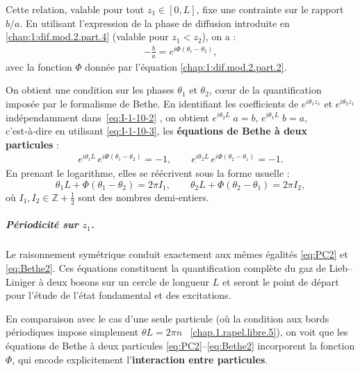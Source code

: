 Cette relation, valable pour tout \( z_1 \in [0,L] \), fixe une contrainte sur le rapport \( b/a \). En utilisant l’expression de la phase de diffusion introduite en \eqref{chap:1:dif.mod.2.part.4} (valable pour $z_1<z_2$), on a :
\begin{eqnarray}\label{eq:I-1-10-3}
	-\frac{b}{a} = e^{i\Phi(\theta_1 - \theta_2)},
\end{eqnarray}
avec la fonction $\Phi$ donnée par l'équation \eqref{chap:1:dif.mod.2.part.2}.

\medskip


On obtient une condition sur les phases \( \theta_1 \) et \( \theta_2 \), cœur de la quantification imposée par le formalisme de Bethe.
En identifiant les coefficients de $e^{i\theta_{1}z_{1}}$ et
$e^{i\theta_{2}z_{1}}$ indépendamment dans~\eqref{eq:I-1-10-2} , on obtient
\(
	e^{i\theta_{2}L}\;a = b, 
	\,
	e^{i\theta_{1}L}\;b = a,
\)
c’est‑à‑dire en utilisant \eqref{eq:I-1-10-3}, les \textbf{équations de Bethe à deux particules} :
\begin{eqnarray}\label{eq:PC2}
	e^{i\theta_{1}L}\,e^{i\Phi(\theta_{1}-\theta_{2})} = -1,
	\qquad
	e^{i\theta_{2}L}\,e^{i\Phi(\theta_{2}-\theta_{1})} = -1.	
\end{eqnarray}
En prenant le logarithme, elles se réécrivent sous la forme usuelle :
\begin{equation}\label{eq:Bethe2}
	\theta_{1}L + \Phi(\theta_{1}-\theta_{2}) = 2\pi I_{1}, 
	\qquad
	\theta_{2}L + \Phi(\theta_{2}-\theta_{1}) = 2\pi I_{2},
\end{equation}
où $I_{1},I_{2}\in\mathbb{Z} + \tfrac{1}{2}$ sont des nombres demi-entiers. 

\subparagraph{Périodicité sur $z_{1}$.}  Le raisonnement symétrique conduit exactement aux mêmes égalités \eqref{eq:PC2} et \eqref{eq:Bethe2}.  Ces équations  constituent la quantification complète du gaz de Lieb–Liniger à deux bosons sur un cercle de longueur $L$ et seront le point de départ pour l’étude de l’état fondamental et des excitations.

\medskip


En comparaison avec le cas d’une seule particule (où la condition aux bords périodiques impose simplement $\theta L = 2\pi n$ ~\eqref{chap.1.rapel.libre.5}), on voit que les équations de Bethe à deux particules \eqref{eq:PC2}--\eqref{eq:Bethe2} incorporent la fonction $\Phi$, qui encode explicitement l’\textbf{interaction entre particules}.

